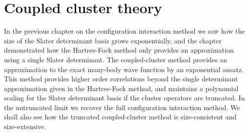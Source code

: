 \chapter{Coupled cluster theory}
    \label{chap:cc}
    In the previous chapter on the configuration interaction method we saw how
    the size of the Slater determinant basis grows exponentially, and the
    chapter demonstrated how the Hartree-Fock method only provides an
    approximation using a single Slater determinant.
    The coupled-cluster method provides an approximation to the exact many-body
    wave function by an exponential ansatz.
    This method provides higher order correlations beyond the single determinant
    approximation given in the Hartree-Fock method, and maintains a polynomial
    scaling for the Slater determinant basis if the cluster operators are
    truncated.
    In the untruncated limit we recover the full configuration interaction
    method.
    We shall also see how the truncated coupled-cluster method is
    size-consistent and size-extensive.


